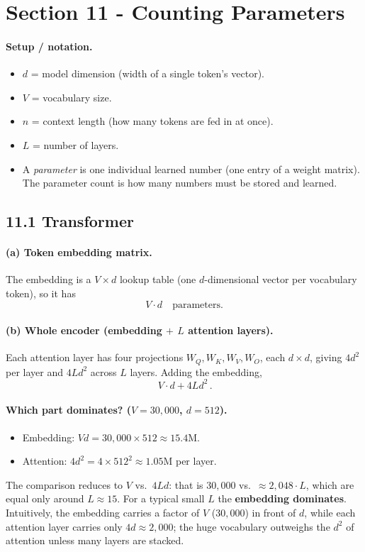 \documentclass[11pt]{article}
\begin{document}
\section{Section 11 - Counting Parameters}

\paragraph{Setup / notation.}
\begin{itemize}
\item $d$ = model dimension (width of a single token's vector).
\item $V$ = vocabulary size.
\item $n$ = context length (how many tokens are fed in at once).
\item $L$ = number of layers.
\item A \emph{parameter} is one individual learned number (one entry of a
weight matrix). The parameter count is how many numbers must be stored and
learned.
\end{itemize}

\subsection*{11.1 \quad Transformer}

\paragraph{(a) Token embedding matrix.}
The embedding is a $V \times d$ lookup table (one $d$-dimensional vector per
vocabulary token), so it has
\[
V \cdot d \quad\text{parameters.}
\]

\paragraph{(b) Whole encoder (embedding $+$ $L$ attention layers).}
Each attention layer has four projections $W_Q, W_K, W_V, W_O$, each $d \times
d$, giving $4d^2$ per layer and $4Ld^2$ across $L$ layers. Adding the embedding,
\[
\boxed{\,V \cdot d + 4 L d^2\,}.
\]

\paragraph{Which part dominates? ($V = 30{,}000$, $d = 512$).}
\begin{itemize}
\item Embedding: $V d = 30{,}000 \times 512 \approx 15.4\text{M}$.
\item Attention: $4 d^2 = 4 \times 512^2 \approx 1.05\text{M}$ per layer.
\end{itemize}
The comparison reduces to $V$ vs.\ $4Ld$: that is $30{,}000$ vs.\ $\approx
2{,}048 \cdot L$, which are equal only around $L \approx 15$. For a typical small
$L$ the \textbf{embedding dominates}. Intuitively, the embedding carries a
factor of $V$ ($30{,}000$) in front of $d$, while each attention layer carries
only $4d \approx 2{,}000$; the huge vocabulary outweighs the $d^2$ of attention
unless many layers are stacked.
\end{document}

